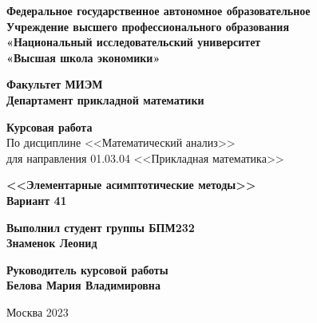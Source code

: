 \documentclass[a4paper, 14pt]{extarticle}
\begin{document}
\begin{titlepage}
    \newpage
    \begin{center}
    {\bfseries 	Федеральное государственное автономное образовательное \\
				Учреждение высшего профессионального образования \\
				«Национальный исследовательский университет \\
				«Высшая школа экономики»}
    \vspace{1cm}
    
    {\bfseries  Факультет МИЭМ \\
				Департамент прикладной математики}
    
    \vspace{1cm}

    {\bfseries{\Large Курсовая работа}} \\
    По дисциплине <<Математический анализ>> \\
    для направления 01.03.04 <<Прикладная математика>>
    
    \vspace{1cm}
    
    {\bfseries{\large 	<<Элементарные асимптотические методы>>} \\
    					Вариант 41}
    
	\end{center}
	
	\vspace{\fill}
	
	\begin{flushright}
	{\bfseries	{\large Выполнил студент группы БПМ232} \\
						Знаменок Леонид}
	
	\vspace{1cm}					
	{\bfseries	{\large Руководитель курсовой работы} \\
			  			Белова Мария Владимировна}
	\end{flushright}
	
	\vspace{1cm}
    \begin{center}
    Москва 2023
    \end{center}

\end{titlepage}
\end{document}
